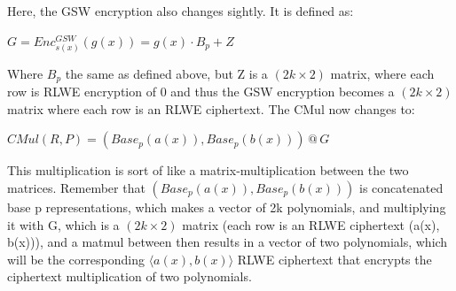 \documentclass{report}
\begin{document}
	Here, the GSW encryption also changes sightly. It is defined as:
	\begin{center}
		$G = Enc^{GSW}_{s(x)} (g(x)) = g(x) \cdot B_p + Z$
	\end{center}
	Where $B_p$ the same as defined above, but Z is a $(2k \times 2)$ matrix, where each row is RLWE encryption of 0 and thus the GSW encryption becomes a $(2k \times 2)$ matrix where each row is an RLWE ciphertext. The CMul now changes to:
	\begin{center}
		$CMul(R, P) = (Base_p(a(x)), Base_p(b(x))) \mathbin{@} G$
	\end{center}
	This multiplication is sort of like a matrix-multiplication between the two matrices. Remember that $(Base_p(a(x)), Base_p(b(x)))$ is concatenated base p representations, which makes a vector of 2k polynomials, and multiplying it with G, which is a $(2k \times 2)$ matrix (each row is an RLWE ciphertext (a(x), b(x))), and a matmul between then results in a vector of two polynomials, which will be the corresponding $\langle a(x), b(x) \rangle$ RLWE ciphertext that encrypts the ciphertext multiplication of two polynomials.
	
\end{document}
